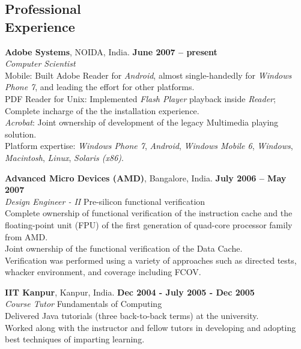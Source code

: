 \documentclass[margin,line]{resume}
\begin{document}
\begin{resume}
	\section{\mysidestyle Professional\\Experience}

	\textbf{Adobe Systems}, NOIDA, India. \hfill \textbf{June 2007 -- present}\vspace{2mm}\\\vspace{1mm}%
	\textsl{Computer Scientist}\\
	Mobile: Built Adobe Reader for \textit{Android}, almost single-handedly for \textit{Windows Phone 7}, and leading the effort for other platforms.\\
	PDF Reader for Unix: Implemented \textit{Flash Player} playback inside \textit{Reader}; Complete incharge of the the installation experience.\\
	\textit{Acrobat}: Joint ownership of development of the legacy Multimedia playing solution.\\
	Platform expertise: \textit{Windows Phone 7}, \textit{Android}, \textit{Windows Mobile 6}, \textit{Windows}, \textit{Macintosh}, \textit{Linux}, \textit{Solaris (x86)}.

	\textbf{Advanced Micro Devices (AMD)}, Bangalore, India. \hfill \textbf{July 2006 -- May 2007}\vspace{2mm}\\\vspace{1mm}%
	\textsl{Design Engineer - II} \hfill Pre-silicon functional verification\\
	Complete ownership of functional verification of the instruction cache and the floating-point unit (FPU) of the first generation of quad-core processor family from AMD.\\
	Joint ownership of the functional verification of the Data Cache.\\
	Verification was performed using a variety of approaches such as directed tests, whacker environment, and coverage including FCOV.

	\textbf{IIT Kanpur}, Kanpur, India. \hfill \textbf{Dec 2004 - July 2005 - Dec 2005} \vspace{2mm}\\\vspace{1mm}%
	\textsl{Course Tutor} \hfill Fundamentals of Computing\\
	Delivered Java tutorials (three back-to-back terms) at the university.\\
	Worked along with the instructor and fellow tutors in developing and adopting best techniques of imparting learning.


\end{resume}
\end{document}
